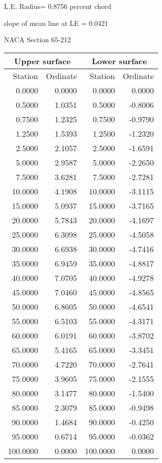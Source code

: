 \documentclass[11pt]{book}
\begin{document}
L.E. Radius=  0.8756 percent chord


 slope of mean line at LE =  0.0421
 \newpage
  \label{s65-212}
 \begin{Large}
 NACA Section 65-212
 \end{Large}
  
 \vspace{8mm}
 \begin{tabular}{|r|r|r|r|} \hline 
 \multicolumn{2}{|c|}{Upper surface} & \multicolumn{2}{|c|}{Lower surface} \\
 \hline
 Station & Ordinate & Station & Ordinate \\
 \hline
0.0000 & 0.0000 & 0.0000 & 0.0000 \\
0.5000 & 1.0351 & 0.5000 & -0.8006 \\
0.7500 & 1.2325 & 0.7500 & -0.9790 \\
1.2500 & 1.5393 & 1.2500 & -1.2320 \\
2.5000 & 2.1057 & 2.5000 & -1.6591 \\
5.0000 & 2.9587 & 5.0000 & -2.2650 \\
7.5000 & 3.6281 & 7.5000 & -2.7281 \\
10.0000 & 4.1908 & 10.0000 & -3.1115 \\
15.0000 & 5.0937 & 15.0000 & -3.7165 \\
20.0000 & 5.7843 & 20.0000 & -4.1697 \\
25.0000 & 6.3098 & 25.0000 & -4.5058 \\
30.0000 & 6.6938 & 30.0000 & -4.7416 \\
35.0000 & 6.9459 & 35.0000 & -4.8817 \\
40.0000 & 7.0705 & 40.0000 & -4.9278 \\
45.0000 & 7.0460 & 45.0000 & -4.8565 \\
50.0000 & 6.8605 & 50.0000 & -4.6541 \\
55.0000 & 6.5103 & 55.0000 & -4.3171 \\
60.0000 & 6.0191 & 60.0000 & -3.8702 \\
65.0000 & 5.4165 & 65.0000 & -3.3451 \\
70.0000 & 4.7220 & 70.0000 & -2.7641 \\
75.0000 & 3.9605 & 75.0000 & -2.1555 \\
80.0000 & 3.1477 & 80.0000 & -1.5400 \\
85.0000 & 2.3079 & 85.0000 & -0.9498 \\
90.0000 & 1.4684 & 90.0000 & -0.4250 \\
95.0000 & 0.6714 & 95.0000 & -0.0362 \\
100.0000 & 0.0000 & 100.0000 & 0.0000 \\
 \hline 
 \end{tabular}
\end{document}
